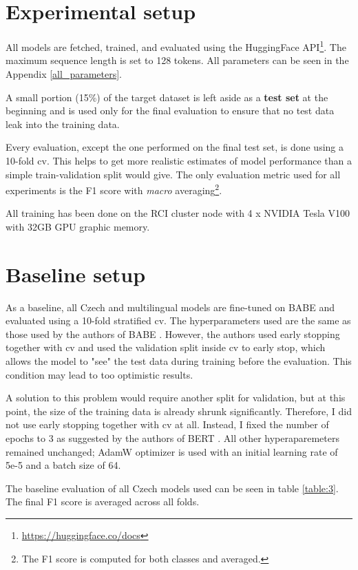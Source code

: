 \section{Experimental setup}
All models are fetched, trained, and evaluated using the HuggingFace API\footnote{\url{https://huggingface.co/docs}}. The maximum sequence length is set to 128 tokens. All parameters can be seen in the Appendix \ref{all_parameters}.

A small portion (15\%) of the target dataset is left aside as a \textbf{test set} at the beginning and is used only for the final evaluation to ensure that no test data leak into the training data.

Every evaluation, except the one performed on the final test set, is done using a 10-fold \gls{cv}. This helps to get more realistic estimates of model performance than a simple train-validation split would give. The only evaluation metric used for all experiments is the F1 score with \textit{macro} averaging\footnote{The F1 score is computed for both classes and averaged.}. 

All training has been done on the RCI cluster node with 4 x NVIDIA Tesla V100 with 32GB GPU graphic memory.





 \section{Baseline setup}
 As a baseline, all Czech and multilingual models are fine-tuned on BABE and evaluated using a 10-fold stratified \gls{cv}. The hyperparameters used are the same as those used by the authors of BABE \cite{Spinde2021MBIC}. However, the authors used early stopping together with \gls{cv} and used the validation split inside \gls{cv} to early stop, which allows the model to "see" the test data during training before the evaluation. This condition may lead to too optimistic results.
 
 A solution to this problem would require another split for validation, but at this point, the size of the training data is already shrunk significantly. Therefore, I did not use early stopping together with \gls{cv} at all. Instead, I fixed the number of epochs to 3 as suggested by the authors of BERT \cite{devlin2019bert} . 
 All other hyperaparemeters remained unchanged; AdamW optimizer is used with an initial learning rate of 5e-5 and a batch size of 64.
 
 The baseline evaluation of all Czech models used can be seen in table \ref{table:3}. The final F1 score is averaged across all folds.
 

